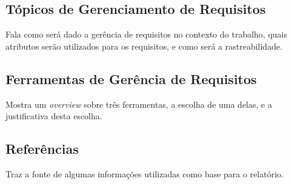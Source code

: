 \subsection{Tópicos de Gerenciamento de Requisitos}
Fala como será dado a gerência de requisitos no contexto do trabalho, quais atributos serão utilizados para os requisitos, e como será a rastreabilidade.
\subsection{Ferramentas de Gerência de Requisitos}
Mostra um \emph{overview} sobre três ferramentas, a escolha de uma delas, e a justificativa desta escolha.
\subsection{Referências}
Traz a fonte de algumas informações utilizadas como base para o relatório.
